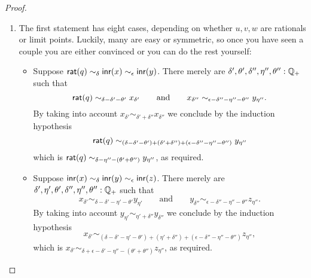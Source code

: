 \begin{proof}
  \mbox{}
  \begin{enumerate}
  \item The first statement has eight cases, depending on whether $u, v, w$ are rationals
    or limit points. Luckily, many are easy or symmetric, so once you have seen a couple
    you are either convinced or you can do the rest yourself:
    \begin{itemize}
    \item Suppose $\mathsf{rat}(q) \sim_\delta \mathsf{inr}(x) \sim_\epsilon \mathsf{inr}(y)$. There merely are
      $\delta', \theta', \delta'', \eta'', \theta'' : \mathbb{Q}_{+}$ such that
      \begin{equation*}
        \mathsf{rat}(q)
        \sim_{\delta - \delta' - \theta'}
        x_{\delta'}
        \qquad\text{and}\qquad
        x_{\delta''}
        \sim_{\epsilon - \delta'' - \eta'' - \theta''}
        y_{\eta''}.
      \end{equation*}
      By taking into account $x_{\delta'} \sim_{\delta' + \delta''} x_{\delta''}$ we
      conclude by the induction hypothesis
      \begin{equation*}
        \mathsf{rat}(q) \sim_{(\delta - \delta' - \theta') + (\delta' + \delta'') + (\epsilon -
          \delta'' - \eta'' - \theta'')} y_{\eta''}
      \end{equation*}
      which is $\mathsf{rat}(q) \sim_{\delta - \eta'' - (\theta' + \theta'')} y_{\eta''}$, as required.
    \item Suppose $\mathsf{inr}(x) \sim_\delta \mathsf{inr}(y) \sim_\epsilon \mathsf{inr}(z)$. There merely are
      $\delta', \eta', \theta', \delta'', \eta'', \theta'' : \mathbb{Q}_{+}$ such that
      \begin{equation*}
        x_{\delta'} \sim_{\delta - \delta' - \eta' - \theta'} y_{\eta'}
        \qquad\text{and}\qquad
        y_{\delta''} \sim_{\epsilon - \delta'' - \eta'' - \theta''} z_{\eta''}.
      \end{equation*}
      By taking into account $y_{\eta'} \sim_{\eta' + \delta''} y_{\delta''}$ we conclude
      by the induction hypothesis
      \begin{equation*}
        x_{\delta'} \sim_{(\delta - \delta' - \eta' - \theta') + (\eta' + \delta'') +
          (\epsilon - \delta'' - \eta'' - \theta'')} z_{\eta''},
      \end{equation*}
      which is $x_{\delta'} \sim_{\delta + \epsilon - \delta' - \eta'' - (\theta' +
        \theta'')} z_{\eta''}$, as required.      

\end{itemize}
\end{enumerate}
\end{proof}
